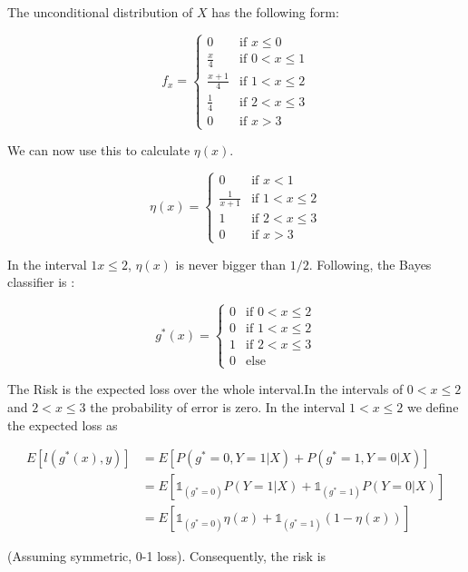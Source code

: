 \documentclass[a4paper, 11pt]{article} %
\begin{document}
The unconditional distribution of $X$ has the following form:

$$f_x = \left\{ \begin{array}{ ll} {0} & {\text {if } x \leq 0} \\ 
{\frac{x}{4}} & {\text{if } 0 < x \leq 1  } \\
{\frac{x+1}{4}} & {\text {if } 1 < x \leq 2} \\
{\frac{1}{4}} & { \text {if } 2 < x \leq 3} \\
{0} & {\text {if } x > 3 } \end{array} \right. $$

We can now use this to calculate $\eta(x)$.

$$\eta(x) = \left\{ \begin{array}{ ll} {0} & {\text {if } x < 1} \\ 
{\frac{1}{x+1}} & {\text{if } 1 < x \leq 2  } \\
{1} & {\text{if } 2 < x \leq 3  } \\
{0} & {\text{if }  x > 3  }
\end{array} \right. $$

In the interval $1 x \leq 2$, $\eta(x)$ is never bigger than $1/2$. Following, the Bayes classifier is :

$$g^*(x) = \left\{ \begin{array}{ ll} {0} & {\text {if } 0 < x \leq 2} \\
{0} & {\text{if } 1 < x \leq 2 } \\
{1} & {\text{if } 2 < x \leq 3 } \\
{0} & {\text{else } }
\end{array} \right. $$

The Risk is the expected loss over the whole interval.In the intervals of $0 < x \leq 2$ and $2 < x \leq 3 $ the probability of error is zero. In the interval $1 < x \leq 2$ we define the expected loss as

\begin{align*}
E\left[l(g^*(x),y) \right]  &= E\left[ P\left(g^*=0 , Y=1 | X\right) +  P\left(g^*=1 , Y=0 | X\right) \right ]\\
&=E \left[ \mathbb{1}_{(g^*=0)} P\left(Y=1 | X\right) +\mathbb{1}_{(g^*=1)} P\left(Y=0 | X\right) \right] \\
&= E \left[ \mathbb{1}_{(g^*=0)} \eta(x) +\mathbb{1}_{(g^*=1)} (1-\eta(x)) \right]
\end{align*}

(Assuming symmetric, 0-1 loss). Consequently, the risk is 
\end{document}
